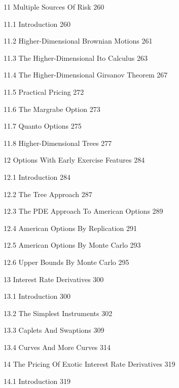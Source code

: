 11 Multiple Sources Of Risk 260



11.1 Introduction 260



11.2 Higher-Dimensional Brownian Motions 261



11.3 The Higher-Dimensional Ito Calculus 263



11.4 The Higher-Dimensional Girsanov Theorem 267



11.5 Practical Pricing 272



11.6 The Margrabe Option 273



11.7 Quanto Options 275



11.8 Higher-Dimensional Trees 277



12 Options With Early Exercise Features 284



12.1 Introduction 284



12.2 The Tree Approach 287



12.3 The PDE Approach To American Options 289



12.4 American Options By Replication 291



12.5 American Options By Monte Carlo 293



12.6 Upper Bounds By Monte Carlo 295



13 Interest Rate Derivatives 300



13.1 Introduction 300



13.2 The Simplest Instruments 302



13.3 Caplets And Swaptions 309



13.4 Curves And More Curves 314



14 The Pricing Of Exotic Interest Rate Derivatives 319



14.1 Introduction 319



